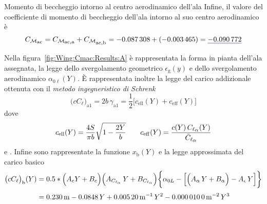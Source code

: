 \documentclass[[12pt,twoside]{book}
\begin{document}
\begin{myExampleX}{Momento di beccheggio intorno al centro aerodinamico dell'ala}{}
Infine, il valore del coefficiente di momento di beccheggio dell'ala intorno al suo centro aerodinamico
è
\[
C_{\mathcal{M}_\mathlarger{\mathrm{ac}}} 
  = C_{\mathcal{M}_\mathlarger{\mathrm{ac,a}}} + C_{\mathcal{M}_\mathlarger{\mathrm{ac,b}}}
  = \SI[round-precision=4]{\myCmZeroAWing}{} 
    +
    ( \SI[round-precision=5]{\myCmZeroBWing}{} )
  = \mathunderline{mydarkblue}{ \SI[round-precision=4]{\myCmZeroWing}{} }
\]

Nella figura~\ref{fig:Wing:Cmac:Results:A} è rappresentata la forma in pianta dell'ala assegnata,
la legge dello svergolamento geometrico $\epsilon_\mathrm{g}(y)$ e dello svergolamento
aerodinamico $\alpha_{0\ell}(Y)$.
È rappresentata inoltre la legge del carico addizionale ottenuta con il \emph{metodo ingegneristico di Schrenk}
\[
\big( cC_\ell \big)_\mathrm{a1} = 2b \, \gamma_\mathrm{a1}
  = \frac{1}{2} \Big[ c_\mathrm{ell}(Y) + c_\mathrm{eff}(Y) \Big]
\]
dove
\[
c_\mathrm{ell}(Y) = \frac{4S}{\pi b} \sqrt{1 - \frac{2Y}{b}}
\qquad
c_\mathrm{eff}(Y) = \frac{ c(Y) \, C_{\ell_\mathlarger{\alpha}}(Y) }{ \bar{C}_{\ell_\mathlarger{\alpha}} }
\]
%
e 
.
%
Infine sono rappresentate la funzione $x_\mathrm{b}(Y)$ e la legge approssimata del carico basico
\[
\begin{split}
\big( cC_\ell \big)_\mathrm{b} (Y)
  & {}=
    0.5*\Big( A_c Y + B_c \Big)
      \Big( A_{C_{\ell_\alpha}} \, Y + B_{C_{\ell_\alpha}} \Big)
    \bigg\{ \alpha_{0L} 
      - \Big[ \Big( A_{\alpha} \, Y + B_{\alpha} \Big) - A_{\epsilon} \, Y \Big]
    \bigg\}
\\[3pt]
  & {}=
      \SI[round-mode=figures,round-precision=3,
        ]{\myCoeffIWing}{\metre}
      \SI[round-mode=figures,round-precision=3,
        ]{\myCoeffJWing}{}\, Y
      +
      \SI[round-mode=figures,round-precision=3,
        ]{\myCoeffKWing}{\metre^{-1}}\, Y^2
      \SI[round-mode=figures,round-precision=3,
        ]{\myCoeffLWing}{\metre^{-2}}\, Y^3
\end{split}
\]

\end{myExampleX}
\end{document}
